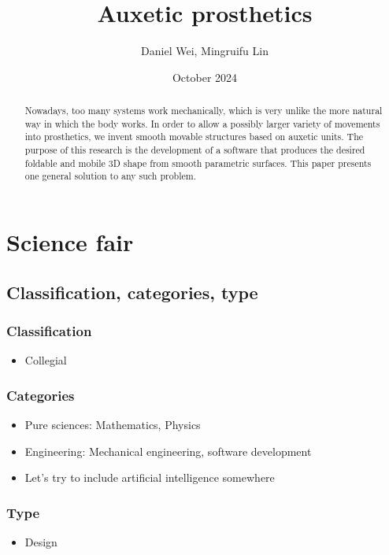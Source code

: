 \documentclass{article}
\title{Auxetic prosthetics}
\author{Daniel Wei, Mingruifu Lin}
\date{October 2024}
\begin{document}
\maketitle

\tableofcontents

\pagebreak

\begin{abstract}
  Nowadays, too many systems work mechanically, which is very unlike the more natural way in which the body works. In order to allow a possibly larger variety of movements into prosthetics, we invent smooth movable structures based on auxetic units. The purpose of this research is the development of a software that produces the desired foldable and mobile 3D shape from smooth parametric surfaces. This paper presents one general solution to any such problem.
\end{abstract}

\pagebreak

\section{Science fair}

\subsection{Classification, categories, type}

\subsubsection{Classification}
\begin{itemize}
  \item Collegial
\end{itemize}

\subsubsection{Categories}
\begin{itemize}
  \item Pure sciences: Mathematics, Physics
  \item Engineering: Mechanical engineering, software development
  \item Let's try to include artificial intelligence somewhere
\end{itemize}

\subsubsection{Type}
\begin{itemize}
  \item Design
\end{itemize}
\end{document}
